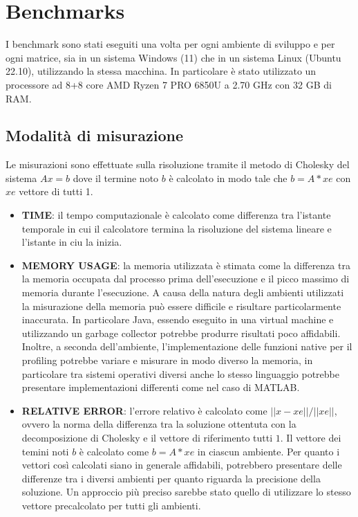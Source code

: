 \documentclass[a4paper, 12pt]{article}
\begin{document}
\section{Benchmarks}
I benchmark sono stati eseguiti una volta per ogni ambiente di sviluppo e per
ogni matrice, sia in un sistema Windows (11) che in un sistema Linux (Ubuntu
22.10), utilizzando la stessa macchina. In particolare è stato utilizzato un
processore ad 8+8 core AMD Ryzen 7 PRO 6850U a 2.70 GHz con 32 GB di RAM.

\subsection{Modalità di misurazione}
Le misurazioni sono effettuate sulla risoluzione tramite il metodo di Cholesky
del sistema $Ax = b$ dove il termine noto $b$ è calcolato in modo tale che
$b = A*xe$ con $xe$ vettore di tutti 1.

\begin{itemize}
  \item \textbf{TIME}: il tempo computazionale è calcolato come differenza tra
  l'istante temporale in cui il calcolatore termina la risoluzione del sistema
  lineare e l'istante in ciu la inizia.
  \item \textbf{MEMORY USAGE}: la memoria utilizzata è stimata come la
  differenza tra la memoria occupata dal processo prima dell'esecuzione e il
  picco massimo di memoria durante l'esecuzione.
  A causa della natura degli ambienti utilizzati la misurazione della memoria
  può essere difficile e risultare particolarmente inaccurata.
  In particolare Java, essendo eseguito in una virtual machine e utilizzando un
  garbage collector potrebbe produrre risultati poco affidabili.\\
  Inoltre, a seconda dell'ambiente, l'implementazione delle funzioni native per
  il profiling potrebbe variare e misurare in modo diverso la memoria, in
  particolare tra sistemi operativi diversi anche lo stesso linguaggio potrebbe
  presentare implementazioni differenti come nel caso di MATLAB.
  \item \textbf{RELATIVE ERROR}: l'errore relativo è calcolato come
  $||x-xe||/||xe||$, ovvero la norma della differenza tra la soluzione ottentuta
  con la decomposizione di Cholesky e il vettore di riferimento tutti $1$.
  Il vettore dei temini noti $b$ è calcolato come $b = A*xe$ in ciascun
  ambiente. Per quanto i vettori così calcolati siano in generale affidabili,
  potrebbero presentare delle differenze tra i diversi ambienti per quanto
  riguarda la precisione della soluzione. Un approccio più preciso sarebbe stato
  quello di utilizzare lo stesso vettore precalcolato per tutti gli ambienti.
\end{itemize}
\end{document}
